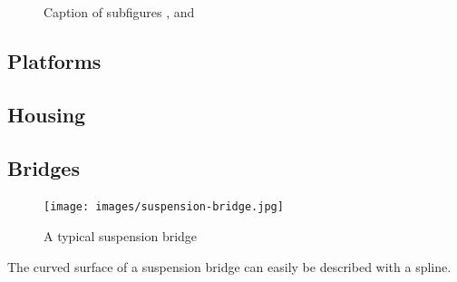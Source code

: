 \begin{figure}[ht]
\centering
{}
\label{fig:archElements}
\caption[Architectural Elements Vocabulary]{Caption of subfigures ,  and }
\end{figure}


 
\subsection{Platforms}
\label{sec:platform}
 


\subsection{Housing}
\label{sec:building}




\subsection{Bridges}
\label{sec:bridges}





\begin{figure}[ht]
\centering
\texttt{[image: images/suspension-bridge.jpg]}
\label{fig:bridgeExample}
\caption{A typical suspension bridge}
\end{figure}
The curved surface of a suspension bridge can easily be described with a spline.   

